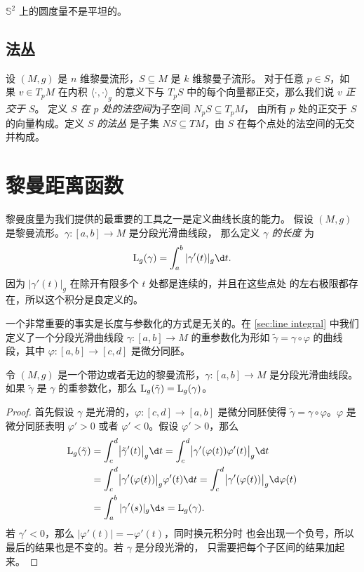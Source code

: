 \begin{corollary}
  $\mathbb{S}^2$ 上的圆度量不是平坦的。
\end{corollary}


\subsection{法丛}

设 $(M,g)$ 是 $n$ 维黎曼流形，$S\subseteq M$ 是 $k$ 维黎曼子流形。
对于任意 $p\in S$，如果 $v\in T_pM$ 在内积 $\langle\cdot,\cdot\rangle_g$
的意义下与 $T_pS$ 中的每个向量都正交，那么我们说 $v$ \emph{正交于 $S$}。
定义 \emph{$S$ 在 $p$ 处的法空间}为子空间 $N_pS\subseteq T_pM$，
由所有 $p$ 处的正交于 $S$ 的向量构成。定义 \emph{$S$ 的法丛}
是子集 $NS\subseteq TM$，由 $S$ 在每个点处的法空间的无交并构成。

\section{黎曼距离函数}

黎曼度量为我们提供的最重要的工具之一是定义曲线长度的能力。
假设 $(M,g)$ 是黎曼流形。$\gamma:[a,b]\to M$ 是分段光滑曲线段，
那么定义 \emph{$\gamma$ 的长度} 为
\[
  \LL_g(\gamma)=\int_a^b|\gamma'(t)|_g \d t.  
\]
因为 $|\gamma'(t)|_g$ 在除开有限多个 $t$ 处都是连续的，并且在这些点处
的左右极限都存在，所以这个积分是良定义的。

一个非常重要的事实是长度与参数化的方式是无关的。在 \ref{sec:line integral}
中我们定义了一个分段光滑曲线段 $\gamma:[a,b]\to M$ 的重参数化为形如
$\tilde\gamma=\gamma\circ\varphi$ 的曲线段，其中 $\varphi:[a,b]\to [c,d]$
是微分同胚。

\begin{proposition}[长度的参数化无关性]
  令 $(M,g)$ 是一个带边或者无边的黎曼流形，$\gamma:[a,b]\to M$ 是分段光滑曲线段。
  如果 $\tilde\gamma$ 是 $\gamma$ 的重参数化，那么 ${\mathrm{L}}_g(\tilde \gamma)={\mathrm{L}}_g(\gamma)$。
\end{proposition}
\begin{proof}
  首先假设 $\gamma$ 是光滑的，$\varphi:[c,d]\to [a,b]$ 是微分同胚使得
  $\tilde{\gamma}=\gamma\circ\varphi$。$\varphi$ 是微分同胚表明 $\varphi'>0$
  或者 $\varphi'<0$。假设 $\varphi'>0$，那么
  \begin{align*}
    \LL_g(\tilde\gamma)&=\int_c^d \bigl|\tilde\gamma'(t)\bigr|_g\d t=
    \int_c^d \bigl|\gamma'(\varphi(t))\varphi'(t)\bigr|_g\d t\\
    &=\int_c^d \bigl|\gamma'(\varphi(t))\bigr|_g\varphi'(t)\d t=
    \int_c^d \bigl|\gamma'(\varphi(t))\bigr|_g\d\varphi(t)\\
    &=\int_a^b|\gamma'(s)|_g\d s=\LL_g(\gamma).
  \end{align*}
  若 $\gamma'<0$，那么 $|\varphi'(t)|=-\varphi'(t)$，同时换元积分时
  也会出现一个负号，所以最后的结果也是不变的。若 $\gamma$ 是分段光滑的，
  只需要把每个子区间的结果加起来。
\end{proof}


